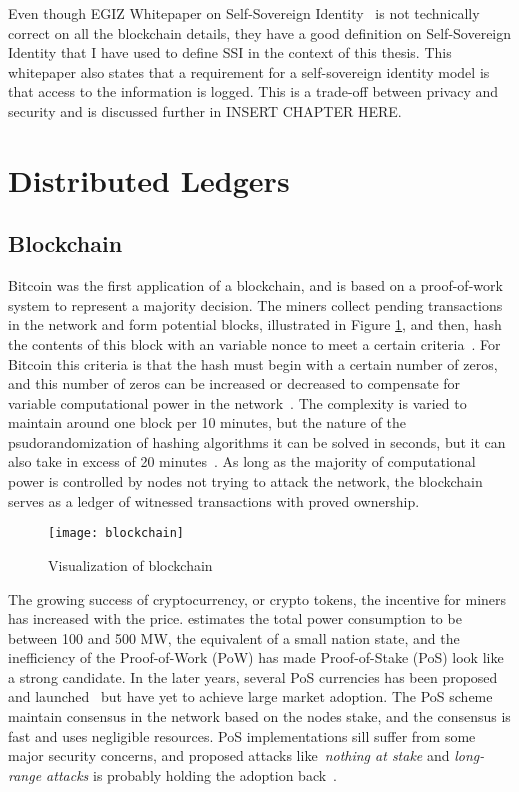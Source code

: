 Even though EGIZ Whitepaper on Self-Sovereign Identity~\cite{ssi} is not technically correct on all the blockchain details, they have a good definition on Self-Sovereign Identity that I have used to define SSI in the context of this thesis. This whitepaper also states that a requirement for a self-sovereign identity model is that access to the information is logged. This is a trade-off between privacy and security and is discussed further in INSERT CHAPTER HERE. 
\section{Distributed Ledgers}
\label{sec:background_dlt}
\subsection{Blockchain}
Bitcoin was the first application of a blockchain, and is based on a proof-of-work system to represent a majority decision. The miners collect pending transactions in the network and form potential blocks, illustrated in Figure \ref{fig:blockchain}, and then, hash the contents of this block with an variable nonce to meet a certain criteria~\cite{bitcoin2008}. For Bitcoin this criteria is that the hash must begin with a certain number of zeros, and this number of zeros can be increased or decreased to compensate for variable computational power in the network~\cite{bitcoin2008}. The complexity is varied to maintain around one block per 10 minutes, but the nature of the psudorandomization of hashing algorithms it can be solved in seconds, but it can also take in excess of 20 minutes~\cite{blockchain_info}. As long as the majority of computational power is controlled by nodes not trying to attack the network, the blockchain serves as a ledger of witnessed transactions with proved ownership.

\begin{figure}[ht]
    \centering
    \texttt{[image: blockchain]}
    \caption{Visualization of blockchain \cite{bitcoin2008}}
    \label{fig:blockchain}
\end{figure}

The growing success of cryptocurrency, or crypto tokens, the incentive for miners has increased with the price. \cite{VRANKEN20171} estimates the total power consumption to be between 100 and 500 MW, the equivalent of a small nation state, and the inefficiency of the Proof-of-Work (PoW) has made Proof-of-Stake (PoS) look like a strong candidate. In the later years, several PoS currencies has been proposed and launched~\cite{Li2017,nxt_whitepaper,blackcoin_pos} but have yet to achieve large market adoption. The PoS scheme maintain consensus in the network based on the nodes stake, and the consensus is fast and uses negligible resources. PoS implementations sill suffer from some major security concerns, and proposed attacks like~\textit{nothing at stake} and \textit{long-range attacks} is probably holding the adoption back~\cite{Li2017}.

